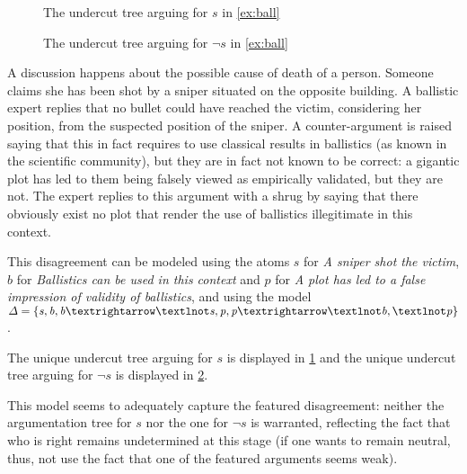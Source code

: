 \documentclass[version=3.21, pagesize, twoside=off, bibliography=totoc, DIV=calc, fontsize=12pt, a4paper, french, english]{scrartcl}
\begin{document}
\begin{figure}
	\caption{The undercut tree arguing for $\mathit{s}$ in \cref{ex:ball}}
	\label{fig:ball}
\end{figure}
\begin{figure}
	\caption{The undercut tree arguing for $¬\mathit{s}$ in \cref{ex:ball}}
	\label{fig:ballnot}
\end{figure}
\begin{example}
	\label{ex:ball}
	A discussion happens about the possible cause of death of a person. Someone claims she has been shot by a sniper situated on the opposite building. A ballistic expert replies that no bullet could have reached the victim, considering her position, from the suspected position of the sniper. A counter-argument is raised saying that this in fact requires to use classical results in ballistics (as known in the scientific community), but they are in fact not known to be correct: a gigantic plot has led to them being falsely viewed as empirically validated, but they are not. The expert replies to this argument with a shrug by saying that there obviously exist no plot that render the use of ballistics illegitimate in this context.
	
	This disagreement can be modeled using the atoms 
	$\mathit{s}$ for \emph{A sniper shot the victim}, 
	$\mathit{b}$ for \emph{Ballistics can be used in this context} and 
	$\mathit{p}$ for \emph{A plot has led to a false impression of validity of ballistics}, 
	and using the model 
	$\Delta = \set{\mathit{s},\allowbreak \mathit{b}, \mathit{b} → ¬\mathit{s}, \mathit{p}, \mathit{p} → ¬\mathit{b}, ¬\mathit{p}}$.
	
	The unique undercut tree arguing for $\mathit{s}$ is displayed in \cref{fig:ball} and the unique undercut tree arguing for $¬\mathit{s}$ is displayed in \cref{fig:ballnot}.
\end{example}
This model seems to adequately capture the featured disagreement: neither the argumentation tree for $\mathit{s}$ nor the one for $¬\mathit{s}$ is warranted, reflecting the fact that who is right remains undetermined at this stage (if one wants to remain neutral, thus, not use the fact that one of the featured arguments seems weak).
\end{document}
